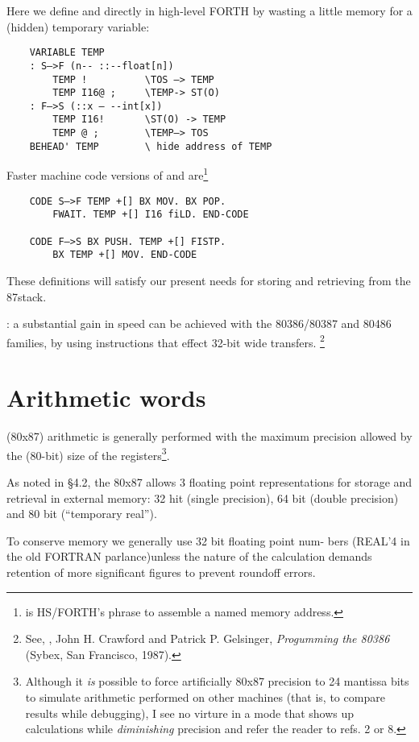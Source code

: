 Here we define  and  directly in high-level FORTH by wasting a little memory for a (hidden) temporary variable:

\begin{lstlisting}
    VARIABLE TEMP
    : S—>F (n-- ::--float[n])
        TEMP !          \TOS —> TEMP
        TEMP I16@ ;     \TEMP-> ST(O)
    : F—>S (::x — --int[x])
        TEMP I16!       \ST(O) -> TEMP
        TEMP @ ;        \TEMP—> TOS
    BEHEAD' TEMP        \ hide address of TEMP
\end{lstlisting}

Faster machine code versions of  and  are\footnote{ is HS/FORTH's phrase to assemble a named memory address.}

\begin{lstlisting}
    CODE S—>F TEMP +[] BX MOV. BX POP.
        FWAIT. TEMP +[] I16 fiLD. END-CODE

    CODE F—>S BX PUSH. TEMP +[] FISTP.
        BX TEMP +[] MOV. END-CODE
\end{lstlisting}

These definitions will satisfy our present needs for storing and retrieving from the 87stack.

\leftbar[1\linewidth]
\Note: a substantial gain in speed can be achieved with the
80386/80387 and 80486 families, by using instructions that effect
32-bit wide transfers.
\endleftbar \footnote{See, \eg, John H. Crawford and Patrick P. Gelsinger, \textit{Progumming the 80386} (Sybex, San Francisco, 1987).}

\section{Arithmetic words}

 (80x87) arithmetic is generally performed with the maximum precision allowed by the (80-bit) size of the registers\footnote{Although it \textit{is} possible to force artificially 80x87 precision to 24 mantissa bits to simulate arithmetic performed on other machines (that is, to compare results while debugging), I see no virture in a mode that shows up calculations while \textit{diminishing} precision and refer the reader to refs. 2 or 8.}.

As noted in §4.2, the 80x87 allows 3 floating point representations
for storage and retrieval in external memory: 32 hit (single precision),
64 bit (double precision) and 80 bit (“temporary real”).

To conserve memory we generally use 32 bit floating point num-
bers (REAL'4 in the old FORTRAN parlance)unless the nature
of the calculation demands retention of more significant figures
to prevent roundoff errors.

